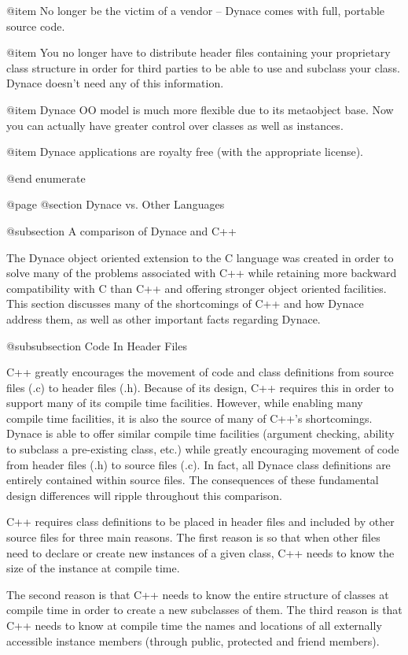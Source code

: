 @item
No longer be the victim of a vendor -- Dynace comes with full, portable
source code.

@item
You no longer have to distribute header files containing your proprietary
class structure in order for third parties to be able to use and
subclass your class.  Dynace doesn't need any of this information.

@item
Dynace OO model is much more flexible due to its metaobject base.  Now
you can actually have greater control over classes as well as instances.

@item
Dynace applications are royalty free (with the appropriate license).

@end enumerate


@page
@section Dynace vs. Other Languages

@subsection A comparison of Dynace and C++

The Dynace object oriented extension to the C language was created in
order to solve many of the problems associated with C++ while retaining
more backward compatibility with C than C++ and offering stronger object
oriented facilities.  This section discusses many of the shortcomings
of C++ and how Dynace address them, as well as other important facts
regarding Dynace.

@subsubsection Code In Header Files

C++ greatly encourages the movement of code and class definitions from
source files (.c) to header files (.h).  Because of its design, C++
requires this in order to support many of its compile time facilities.
However, while enabling many compile time facilities, it is also the
source of many of C++'s shortcomings.  Dynace is able to offer similar
compile time facilities (argument checking, ability to subclass a
pre-existing class, etc.) while greatly encouraging movement of code
from header files (.h) to source files (.c).  In fact, all Dynace
class definitions are entirely contained within source files.  The
consequences of these fundamental design differences will ripple
throughout this comparison.

C++ requires class definitions to be placed in header files and
included by other source files for three main reasons.  The first reason
is so that when other files need to declare or create new instances of
a given class, C++ needs to know the size of the instance at compile
time.

The second reason is that C++ needs to know the entire structure of
classes at compile time in order to create a new subclasses of them.
The third reason is that C++ needs to know at compile time the names
and locations of all externally accessible instance members (through
public, protected and friend members).

